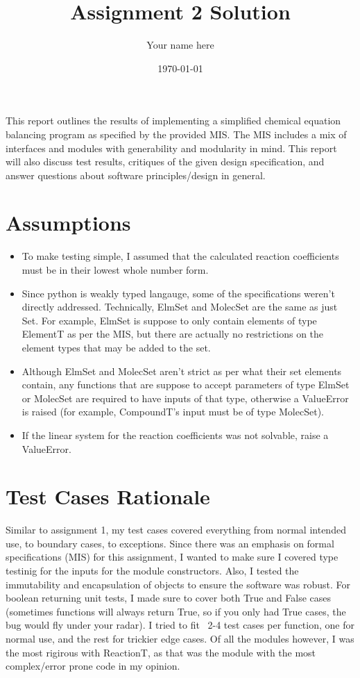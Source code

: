 \documentclass[12pt]{article}
\title{Assignment 2 Solution}
\author{Your name here}
\date{\today}
\begin{document}
\maketitle

This report outlines the results of implementing a simplified chemical equation balancing program as specified by the provided MIS. The MIS includes a mix of interfaces and modules with generability and modularity in mind. This report will also discuss test results, critiques of the given design specification, and answer questions about software principles/design in general.

\section{Assumptions}
\begin{itemize}
    \item To make testing simple, I assumed that the calculated reaction coefficients must be in their lowest whole number form.
    \item Since python is weakly typed langauge, some of the specifications weren't directly addressed. Technically, ElmSet and MolecSet are the same as just Set. For example, ElmSet is suppose to only contain elements of type ElementT as per the MIS, but there are actually no restrictions on the element types that may be added to the set.
    \item Although ElmSet and MolecSet aren't strict as per what their set elements contain, any functions that are suppose to accept parameters of type ElmSet or MolecSet are required to have inputs of that type, otherwise a ValueError is raised (for example, CompoundT's input must be of type MolecSet).
    \item If the linear system for the reaction coefficients was not solvable, raise a ValueError.
\end{itemize}

\section{Test Cases Rationale}
Similar to assignment 1, my test cases covered everything from normal intended use, to boundary cases, to exceptions. Since there was an emphasis on formal specifications (MIS) for this assignment, I wanted to make sure I covered type testinig for the inputs for the module constructors. Also, I tested the immutability and encapsulation of objects to ensure the software was robust. For boolean returning unit tests, I made sure to cover both True and False cases (sometimes functions will always return True, so if you only had True cases, the bug would fly under your radar). I tried to fit ~2-4 test cases per function, one for normal use, and the rest for trickier edge cases. Of all the modules however, I was the most rigirous with ReactionT, as that was the module with the most complex/error prone code in my opinion.
\end{document}
